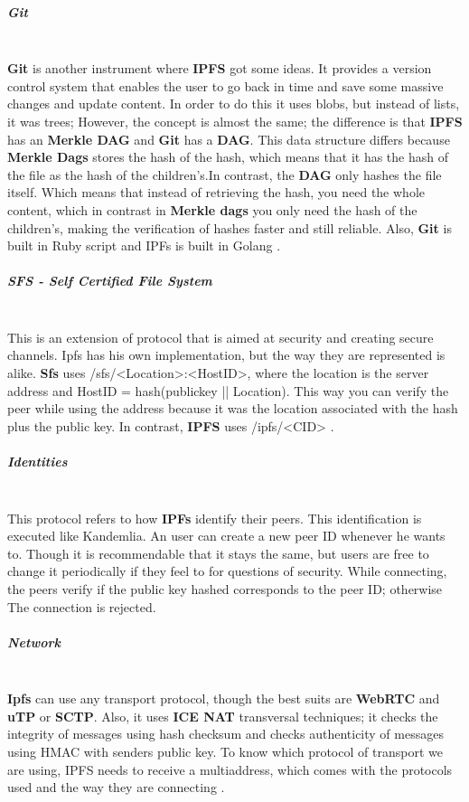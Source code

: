 \subparagraph{Git}\mbox{}\\
\textbf{Git} is another instrument where \textbf{IPFS} got some ideas. It provides a version control system that enables the user to go back in time and save some massive changes and update content. In order to do this it uses blobs, but instead of lists, it was trees; However, the concept is almost the same; the difference is that \textbf{IPFS} has an \textbf{Merkle DAG} and \textbf{Git} has a \textbf{DAG}. This data structure differs because \textbf{Merkle Dags} stores the hash of the hash, which means that it has the hash of the file as the hash of the children's.In contrast, the \textbf{DAG} only hashes the file itself. Which means that instead of retrieving the hash, you need the whole content, which in contrast in \textbf{Merkle dags} \cite{merkle-dag} you only need the hash of the children's, making the verification of hashes faster and still reliable. Also, \textbf{Git} is built in Ruby script and IPFs is built in Golang \cite{git}.

\subparagraph{SFS - Self Certified File System}\mbox{}\\
This is an extension of protocol that is aimed at security and creating secure channels. Ipfs has his own implementation, but the way they are represented is alike.
\textbf{Sfs} uses /sfs/<Location>:<HostID>, where the location is the server address and HostID = hash(publickey || Location). This way you can verify the peer while using the address because it was the location associated with the hash
plus the public key. In contrast, \textbf{IPFS} uses /ipfs/<CID> \cite{SFS}.

\subparagraph{Identities}  \mbox{} \\
This protocol refers to how \textbf{IPFs} identify their peers. This identification is executed like Kandemlia. An user can create a new peer ID whenever he wants to. Though it is recommendable that it stays the same, but users are free to
change it periodically if they feel to for questions of security. While connecting, the peers verify if the public key hashed corresponds to the peer ID; otherwise
The connection is rejected.

\subparagraph{Network}  \mbox{} \\
\textbf{Ipfs} can use any transport protocol, though the best suits are \textbf{WebRTC} and \textbf{uTP} or \textbf{SCTP}. Also, it uses \textbf{ICE NAT} transversal techniques; it checks the integrity of
messages using hash checksum and checks authenticity of messages using HMAC with senders public key. To know which protocol of transport we are using, IPFS needs to receive a multiaddress, which comes with the protocols used and
the way they are connecting \cite{webrtc} \cite{utp} \cite{sctp} \cite{ietf-ice}.

